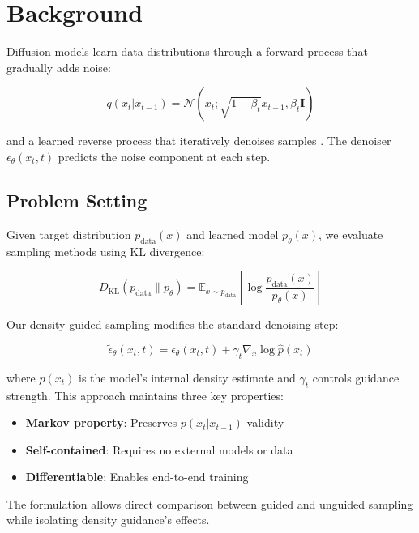 \documentclass{article} %
\begin{document}
\section{Background}
\label{sec:background}

Diffusion models learn data distributions through a forward process that gradually adds noise:

\begin{equation}
    q(x_t|x_{t-1}) = \mathcal{N}(x_t; \sqrt{1-\beta_t}x_{t-1}, \beta_t\mathbf{I})
\end{equation}

and a learned reverse process that iteratively denoises samples \citep{ddpm}. The denoiser $\epsilon_\theta(x_t,t)$ predicts the noise component at each step.

\subsection{Problem Setting}
Given target distribution $p_{\text{data}}(x)$ and learned model $p_\theta(x)$, we evaluate sampling methods using KL divergence:

\begin{equation}
    D_{\text{KL}}(p_{\text{data}} \| p_\theta) = \mathbb{E}_{x\sim p_{\text{data}}}\left[\log\frac{p_{\text{data}}(x)}{p_\theta(x)}\right]
\end{equation}

Our density-guided sampling modifies the standard denoising step:

\begin{equation}
    \tilde{\epsilon}_\theta(x_t,t) = \epsilon_\theta(x_t,t) + \gamma_t\nabla_x\log\hat{p}(x_t)
\end{equation}

where $\hat{p}(x_t)$ is the model's internal density estimate and $\gamma_t$ controls guidance strength. This approach maintains three key properties:

\begin{itemize}
    \item \textbf{Markov property}: Preserves $p(x_t|x_{t-1})$ validity
    \item \textbf{Self-contained}: Requires no external models or data
    \item \textbf{Differentiable}: Enables end-to-end training
\end{itemize}

The formulation allows direct comparison between guided and unguided sampling while isolating density guidance's effects.
\end{document}
